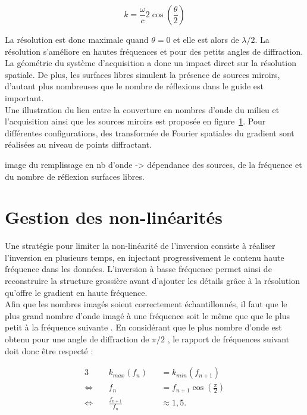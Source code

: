 \begin{equation}
	k= \frac{\omega}{c} 2 \cos\left( \frac{\theta}{2}\right)
\end{equation}

La résolution est donc maximale quand $\theta=0$ et elle est alors de $\lambda/2$. La résolution s'améliore en hautes fréquences et pour des petits angles de diffraction. La géométrie du système d'acquisition a donc un impact direct sur la résolution spatiale. De plus, les surfaces libres simulent la présence de sources miroirs, d'autant plus nombreuses que le nombre de réflexions dans le guide est important. \\



Une illustration du lien entre la couverture en nombres d'onde du milieu et l'acquisition ainsi que les sources miroirs est proposée en figure~\ref{}. Pour différentes configurations, des transformée de Fourier spatiales du gradient sont réalisées au niveau de points diffractant.



image du remplissage en nb d'onde -> dépendance des sources, de la fréquence et du nombre de réflexion surfaces libres.

\section{Gestion des non-linéarités}
Une stratégie pour limiter la non-linéarité de l'inversion consiste à réaliser l'inversion en plusieurs temps, en injectant progressivement le contenu haute fréquence dans les données. L'inversion à basse fréquence permet ainsi de reconstruire la structure grossière avant d'ajouter les détails grâce à la résolution qu'offre le gradient en haute fréquence.\\



Afin que les nombres imagés soient correctement échantillonnés, il faut que le plus grand nombre d'onde imagé à une fréquence soit le même que que le plus petit à la fréquence suivante \citep{sirgue}. En considérant que le plus nombre d'onde est obtenu pour une angle de diffraction de $\pi/2$ , le rapport de fréquences suivant doit donc être respecté : 

\begin{alignat*}{3}
	  ~&k_{max}(f_{n}) &&= k_{min}(f_{n+1})\\
	\Leftrightarrow~~~~~ &  f_n &&= f_{n+1}\cos \left(\frac{\pi}{2} \right)\\
	 \Leftrightarrow~~~~~ & \frac{f_{n+1}}{f_n} && \approx  1,5.
\end{alignat*} 

